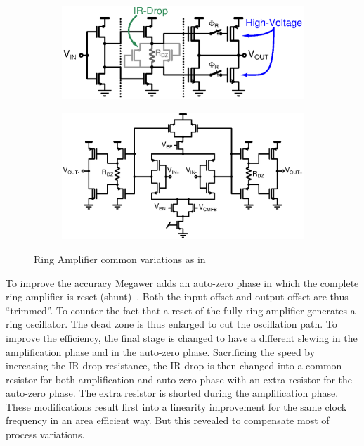 \begin{figure}[htp]
	\centering
    \begin{subfigure}[b]{0.5\textwidth}
        \includegraphics[width=\textwidth]{Chapter3/Figs/ring_amplifier_variations.ps}
        \label{fig:ring_amp_variation}
	\end{subfigure}
	\begin{subfigure}[b]{0.48\textwidth}
        \includegraphics[width=\textwidth]{Chapter3/Figs/fully_diff_ring_amp.ps}
        \label{fig:ring_amp_fd}
    \end{subfigure}
	\caption[Ring Amplifier common variations]{Ring Amplifier common variations as in~\cite{YLim2015,YLim2015FD,YCao2017}}
	\label{fig:algo_ring_amp}
\end{figure}

To improve the accuracy Megawer adds an auto-zero phase in which the complete ring amplifier is reset (shunt)~\cite{Megawer2016}. Both the input offset and output offset are thus ``trimmed''. To counter the fact that a reset of the fully ring amplifier generates a ring oscillator. The dead zone is thus enlarged to cut the oscillation path. To improve the efficiency, the final stage is changed to have a different slewing in the amplification phase and in the auto-zero phase. Sacrificing the speed by increasing the IR drop resistance, the IR drop is then changed into a common resistor for both amplification and auto-zero phase with an extra resistor for the auto-zero phase. The extra resistor is shorted during the amplification phase. These modifications result first into a linearity improvement for the same clock frequency in an area efficient way. But this revealed to compensate most of process variations.

